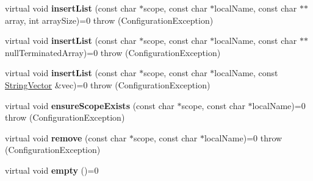 \begin{DoxyCompactItemize}
\item 
\hypertarget{classCONFIG4CPP__NAMESPACE_1_1Configuration_a3e1c09a93f7ac0abe44368d9a65afd23}{virtual void {\bfseries insert\-List} (const char $\ast$scope, const char $\ast$local\-Name, const char $\ast$$\ast$array, int array\-Size)=0  throw (\-Configuration\-Exception)}\label{classCONFIG4CPP__NAMESPACE_1_1Configuration_a3e1c09a93f7ac0abe44368d9a65afd23}

\item 
\hypertarget{classCONFIG4CPP__NAMESPACE_1_1Configuration_a0bc15285cf5f7ea5aa2ccf26a94590a3}{virtual void {\bfseries insert\-List} (const char $\ast$scope, const char $\ast$local\-Name, const char $\ast$$\ast$null\-Terminated\-Array)=0  throw (\-Configuration\-Exception)}\label{classCONFIG4CPP__NAMESPACE_1_1Configuration_a0bc15285cf5f7ea5aa2ccf26a94590a3}

\item 
\hypertarget{classCONFIG4CPP__NAMESPACE_1_1Configuration_a6496260411337a65f0d82fae0ff552c6}{virtual void {\bfseries insert\-List} (const char $\ast$scope, const char $\ast$local\-Name, const \hyperlink{classCONFIG4CPP__NAMESPACE_1_1StringVector}{String\-Vector} \&vec)=0  throw (\-Configuration\-Exception)}\label{classCONFIG4CPP__NAMESPACE_1_1Configuration_a6496260411337a65f0d82fae0ff552c6}

\item 
\hypertarget{classCONFIG4CPP__NAMESPACE_1_1Configuration_a497d3a52000cdf672ad893db8ea1ccef}{virtual void {\bfseries ensure\-Scope\-Exists} (const char $\ast$scope, const char $\ast$local\-Name)=0  throw (\-Configuration\-Exception)}\label{classCONFIG4CPP__NAMESPACE_1_1Configuration_a497d3a52000cdf672ad893db8ea1ccef}

\item 
\hypertarget{classCONFIG4CPP__NAMESPACE_1_1Configuration_abe28bb7ebf77e8b98847cbc457f58bc7}{virtual void {\bfseries remove} (const char $\ast$scope, const char $\ast$local\-Name)=0  throw (\-Configuration\-Exception)}\label{classCONFIG4CPP__NAMESPACE_1_1Configuration_abe28bb7ebf77e8b98847cbc457f58bc7}

\item 
\hypertarget{classCONFIG4CPP__NAMESPACE_1_1Configuration_ab4b0970b66d66ef42f63f7701c3ca928}{virtual void {\bfseries empty} ()=0}\label{classCONFIG4CPP__NAMESPACE_1_1Configuration_ab4b0970b66d66ef42f63f7701c3ca928}

\end{DoxyCompactItemize}
